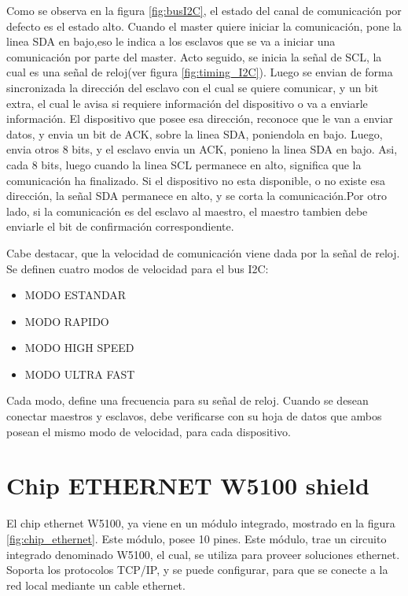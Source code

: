 Como se observa en la figura \ref{fig:busI2C}, el estado del canal de comunicación por defecto es el estado alto. Cuando el master quiere iniciar la comunicación, pone la linea SDA en bajo,eso le indica a los esclavos que se va a iniciar una comunicación por parte del master. Acto seguido, se inicia la señal de SCL, la cual es una señal de reloj(ver figura \ref{fig:timing_I2C}). Luego se envian de forma sincronizada la dirección del esclavo con el cual se quiere comunicar, y un bit extra, el cual le avisa si requiere información del dispositivo o va a enviarle información. El dispositivo que posee esa dirección, reconoce que le van a enviar datos, y envia un bit de ACK, sobre la linea SDA, poniendola en bajo. Luego, envia otros 8 bits, y el esclavo envia un ACK, ponieno la linea SDA en bajo. Asi, cada 8 bits, luego cuando la linea SCL permanece en alto, significa que la comunicación ha finalizado. Si el dispositivo no esta disponible, o no existe esa dirección, la señal SDA permanece en alto, y se corta la comunicación.Por otro lado, si la comunicación es del esclavo al maestro, el maestro tambien debe enviarle el bit de confirmación correspondiente.  

Cabe destacar, que la velocidad de comunicación viene dada por la señal de reloj. Se definen cuatro modos de velocidad para el bus I2C: 
\begin{itemize}
	\item MODO ESTANDAR
	\item MODO RAPIDO 
	\item MODO HIGH SPEED
	\item MODO ULTRA FAST 
\end{itemize}

Cada modo, define una frecuencia para su señal de reloj. Cuando se desean conectar maestros y esclavos, debe verificarse con su hoja de datos que ambos posean el mismo modo de velocidad, para cada dispositivo. 


\section{Chip ETHERNET W5100 shield }

El chip ethernet W5100, ya viene en un módulo integrado, mostrado en la figura \ref{fig:chip_ethernet}. Este módulo, posee 10 pines. Este módulo, trae un circuito integrado denominado W5100, el cual, se utiliza para proveer soluciones ethernet. Soporta los protocolos TCP/IP, y se puede configurar, para que se conecte a la red local mediante un cable ethernet. 

